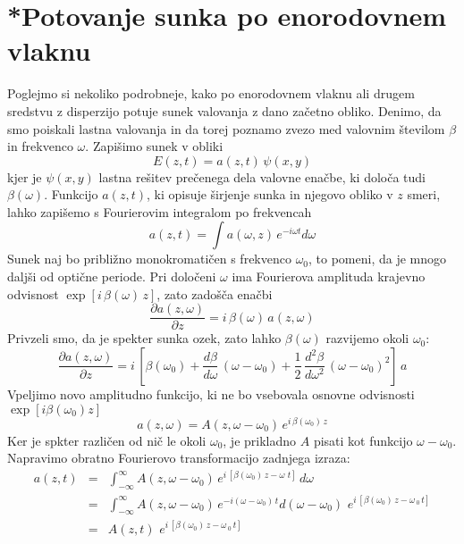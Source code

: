 \section{*Potovanje sunka po enorodovnem vlaknu}
\label{chap:sunvl}
Poglejmo si nekoliko podrobneje, kako po enorodovnem vlaknu ali drugem
sredstvu z disperzijo potuje sunek valovanja z dano začetno obliko.
Denimo, da smo poiskali lastna valovanja in da torej poznamo zvezo
med valovnim številom $\beta$ in frekvenco $\omega$. Zapišimo sunek
v obliki 
\begin{equation}
E\left(z,t\right)=a\left(z,t\right)\,\psi\left(x,y\right)\label{9.61}
\end{equation}
kjer je $\psi\left(x,y\right)$ lastna rešitev prečenega dela valovne
enačbe, ki določa tudi $\beta\left(\omega\right)$. Funkcijo $a\left(z,t\right)$,
ki opisuje širjenje sunka in njegovo obliko v $z$ smeri, lahko zapišemo
s Fourierovim integralom po frekvencah 
\begin{equation}
a\left(z,t\right)=\int a(\omega,z)\, e^{-i\omega t}d\omega\label{9.62}
\end{equation}
Sunek naj bo približno monokromatičen s frekvenco $\omega_{0}$,
to pomeni, da je mnogo daljši od optične periode. Pri določeni $\omega$
ima Fourierova amplituda krajevno odvisnost $\exp[i\,\beta\left(\omega\right)\, z]$,
zato zadošča enačbi 
\begin{equation}
\frac{\partial a\left(z,\omega\right)}{\partial z}=i\,\beta\left(\omega\right)\, a\left(z,\omega\right)\label{9.63}
\end{equation}
 Privzeli smo, da je spekter sunka ozek, zato lahko $\beta\left(\omega\right)$
razvijemo okoli $\omega_{0}$: 
\begin{equation}
\frac{\partial a\left(z,\omega\right)}{\partial z}=i\,\left[\beta\left(\omega_{0}\right)+\frac{d\beta}{d\omega}\,\left(\omega-\omega_{0}\right)+\frac{1}{2}\,\frac{d^{2}\beta}{d\omega^{2}}\,\left(\omega-\omega_{0}\right)^{2}\right]\, a\label{9.64}
\end{equation}
 Vpeljimo novo amplitudno funkcijo, ki ne bo vsebovala osnovne odvisnosti
$\exp[i\beta\left(\omega_{0}\right)z]$ 
\begin{equation}
a\left(z,\omega\right)=A\left(z,\omega-\omega_{0}\right)\, e^{i\,\beta\left(\omega_{0}\right)\, z}\label{9.65}
\end{equation}
 Ker je spkter različen od nič le okoli $\omega_{0}$, je prikladno
$A$ pisati kot funkcijo $\omega-\omega_{0}$. Napravimo obratno Fourierovo
transformacijo zadnjega izraza: 
\begin{eqnarray}
a\left(z,t\right) & = & \int_{-\infty}^{\infty}A\left(z,\omega-\omega_{0}\right)\, e^{i\,[\beta\left(\omega_{0}\right)\, z-\omega\,\, t]}\, d\omega\label{9.66}\\
 & = & \int_{-\infty}^{\infty}A\left(z,\omega-\omega_{0}\right)\, e^{-i\left(\omega-\omega_{0}\right)\, t}d\left(\omega-\omega_{0}\right)\,\, e^{i\,[\beta\left(\omega_{0}\right)\, z-\omega\,_{0}\, t]}\nonumber \\
 & = & A\left(z,t\right)\,\, e^{i\,[\beta\left(\omega_{0}\right)\, z-\omega\,_{0}\, t]}\nonumber 
\end{eqnarray}
